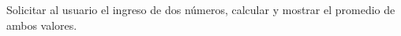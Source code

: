 Solicitar al usuario el ingreso de dos n\'umeros, calcular y mostrar el promedio de ambos valores.



\volverindice
\newpage
